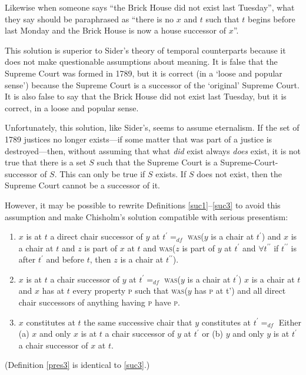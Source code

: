 \documentclass[11pt]{article}
\begin{document}
\begin{spacing}{1.5}
Likewise when someone says ``the Brick House did not exist last
Tuesday'', what they say should be paraphrased as ``there is no $x$
and $t$ such that $t$ begins before last Monday and the Brick House is
now a house successor of $x$''.

This solution is superior to Sider's theory of temporal counterparts
because it does not make questionable assumptions about meaning.  It
is false that the Supreme Court was formed in 1789, but it is correct
(in a `loose and popular sense') because the Supreme Court is a
successor of the `original' Supreme Court.  It is also false to say
that the Brick House did not exist last Tuesday, but it is correct, in
a loose and popular sense.

Unfortunately, this solution, like Sider's, seems to assume
eternalism.  If the set of 1789 justices no longer exists---if some
matter that was part of a justice is destroyed---then, without
assuming that what {\em did} exist always {\em does} exist, it is not
true that there is a set $S$ such that the Supreme Court is a
Supreme-Court-successor of $S$.  This can only be true if $S$ exists.
If $S$ does not exist, then the Supreme Court cannot be a successor of
it.

However, it may be possible to rewrite Definitions
\ref{suc1}--\ref{suc3} to avoid this assumption and make Chisholm's
solution compatible with serious presentism:

\begin{enumerate}[label=\arabic*a., ref=\arabic*a]
  \item $x$ is at $t$ a direct chair successor of $y$ at $t^{\prime}
    =_{df}$ \textsc{was}($y$ is a chair at $t^{\prime}$) and $x$ is a
    chair at $t$ and $z$ is part of $x$ at $t$ and \textsc{was}($z$ is
    part of $y$ at $t^{\prime}$ and $\forall t^{\prime\prime}$ if
    $t^{\prime\prime}$ is after $t^{\prime}$ and before $t$, then $z$
    is a chair at $t^{\prime\prime}$). \label{pres1}
  \item $x$ is at $t$ a chair successor of $y$ at $t^{\prime} =_{df}$
    \textsc{was}($y$ is a chair at $t^{\prime}$) $x$ is a chair at $t$
    and $x$ has at $t$ every property \textsc{p} such that
    \textsc{was}($y$ has \textsc{p} at t') and all direct chair
    successors of anything having \textsc{p} have
    \textsc{p}. \label{pres2}
  \item $x$ constitutes at $t$ the same successive chair that $y$
    constitutes at $t^{\prime} =_{df}$ Either (a) $x$ and only $x$ is
    at $t$ a chair successor of $y$ at $t^{\prime}$ or (b) $y$ and
    only $y$ is at $t^{\prime}$ a chair successor of $x$ at
    $t$. \label{pres3}
\end{enumerate}
(Definition \ref{pres3} is identical to \ref{suc3}.)


\end{spacing}
\end{document}

